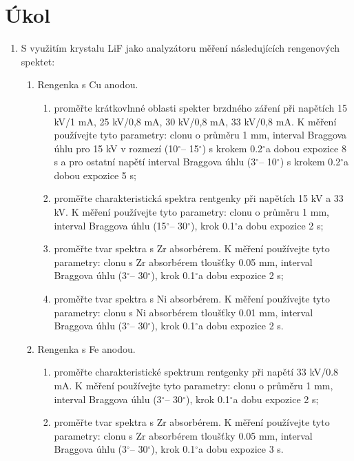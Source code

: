 \documentclass[a4paper,12pt]{article}
\newcommand{\st}{$^{\circ}$}
\begin{document}
\section{Úkol}
\begin{enumerate}
    \item S využitím krystalu LiF jako analyzátoru měření následujících rengenových spektet:
        \begin{enumerate}
            \item Rengenka s Cu anodou.
                \begin{enumerate}
                    \item proměřte krátkovlnné oblasti spekter brzdného záření při napětích 15 kV/1 mA, 25 kV/0,8 mA, 30 kV/0,8 mA, 33 kV/0,8 mA. K měření používejte tyto parametry: 
                    clonu o průměru 1 mm, interval Braggova úhlu pro 15 kV v rozmezí (10\st – 15\st) s krokem 0.2\st a dobou expozice 8 s a pro ostatní napětí interval Braggova úhlu (3\st – 10\st) s krokem 0.2\st a dobou expozice 5 s;
                    \item proměřte charakteristická spektra rentgenky při napětích 15 kV a 33 kV. K měření používejte tyto parametry: clonu o průměru 1 mm, interval Braggova úhlu (15\st – 30\st), krok 0.1\st a dobu expozice 2 s;
                    \item proměřte tvar spektra s Zr absorbérem. K měření používejte tyto parametry: clonu s Zr absorbérem tloušťky 0.05 mm, interval Braggova úhlu (3\st – 30\st), krok 0.1\st a dobu expozice 2 s;
                    \item proměřte tvar spektra s Ni absorbérem. K měření používejte tyto parametry: clonu s Ni absorbérem tloušťky 0.01 mm, interval Braggova úhlu (3\st – 30\st), krok 0.1\st a dobu expozice 2 s. 
                \end{enumerate}
            \item Rengenka s Fe anodou.
                \begin{enumerate}
                    \item proměřte charakteristické spektrum rentgenky při napětí 33 kV/0.8 mA. K měření používejte tyto parametry: clonu o průměru 1 mm, interval Braggova úhlu (3\st – 30\st), krok 0.1\st a dobu expozice 2 s;
                    \item proměřte tvar spektra s Zr absorbérem. K měření používejte tyto parametry: clonu s Zr absorbérem tloušťky 0.05 mm, interval Braggova úhlu (3\st – 30\st), krok 0.1\st a dobu expozice 3 s. 
                \end{enumerate}

\end{enumerate}
\end{enumerate}
\end{document}
